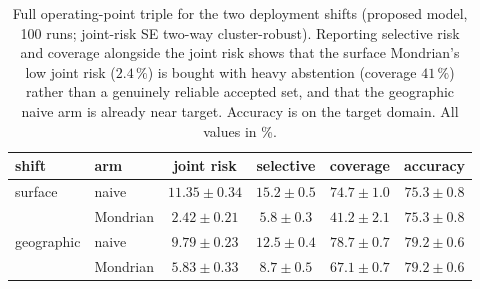 \documentclass[preprint,3p,times]{elsarticle}
\begin{document}
\begin{table}[t]
\centering
\caption{Full operating-point triple for the two deployment shifts (proposed model, 100 runs; joint-risk SE two-way cluster-robust). Reporting selective risk and coverage alongside the joint risk shows that the surface Mondrian's low joint risk ($2.4\,\%$) is bought with heavy abstention (coverage $41\,\%$) rather than a genuinely reliable accepted set, and that the geographic naive arm is already near target. Accuracy is on the target domain. All values in \%.}
\label{tab:deploytriple}
\begin{tabular}{llcccc}
\toprule
shift & arm & joint risk & selective & coverage & accuracy \\
\midrule
surface    & naive    & $11.35\pm0.34$ & $15.2\pm0.5$ & $74.7\pm1.0$ & $75.3\pm0.8$ \\
           & Mondrian & $2.42\pm0.21$  & $5.8\pm0.3$  & $41.2\pm2.1$ & $75.3\pm0.8$ \\
\midrule
geographic & naive    & $9.79\pm0.23$  & $12.5\pm0.4$ & $78.7\pm0.7$ & $79.2\pm0.6$ \\
           & Mondrian & $5.83\pm0.33$  & $8.7\pm0.5$  & $67.1\pm0.7$ & $79.2\pm0.6$ \\
\bottomrule
\end{tabular}
\end{table}
\end{document}
